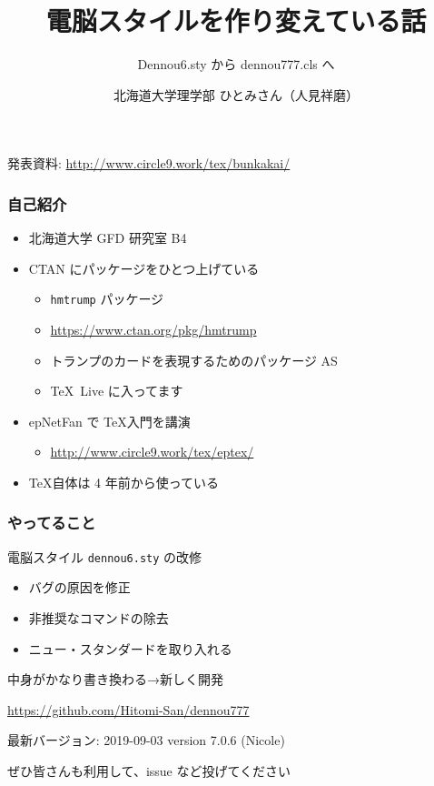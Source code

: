 \documentclass[unicode,12pt,colorlinks,]{beamer}
\title{電脳スタイルを作り変えている話}
\subtitle{Dennou6.sty から dennou777.cls へ}
\author{北海道大学理学部 ひとみさん（人見祥磨）}
\date{\warekitoday}
\newcommand{\centeralign}[1]{\rule{0pt}{0pt}\hfill#1\hfill\rule{0pt}{0pt}}
\begin{document}
\begin{frame}
	\maketitle
	
	\centeralign{{\footnotesize 発表資料: \url{http://www.circle9.work/tex/bunkakai/}}}
\end{frame}

\begin{frame}
	\frametitle{自己紹介}
	\begin{itemize}
		\item 北海道大学 GFD 研究室 B4
		\item CTAN にパッケージをひとつ上げている
			\begin{itemize}
				\item \texttt{hmtrump} パッケージ
				\item \url{https://www.ctan.org/pkg/hmtrump}
				\item トランプのカードを表現するためのパッケージ \trump AS
				\item \TeX\ Live に入ってます
			\end{itemize}
		\item epNetFan で \TeX 入門を講演
			\begin{itemize}
				\item \url{http://www.circle9.work/tex/eptex/}
			\end{itemize}
		\item \TeX 自体は 4 年前から使っている
	\end{itemize}
\end{frame}


\begin{frame}
	\frametitle{やってること}
	電脳スタイル \texttt{dennou6.sty} の改修

	\begin{itemize}
		\item バグの原因を修正
		\item 非推奨なコマンドの除去
		\item ニュー・スタンダードを取り入れる
	\end{itemize}

	中身がかなり書き換わる→新しく開発
\end{frame}

\begin{frame}
	\begin{center}
		{\LARGE{}}

		\url{https://github.com/Hitomi-San/dennou777}

		最新バージョン: 2019-09-03 version 7.0.6 (Nicole)

		\vspace{5ex}
		ぜひ皆さんも利用して、issue など投げてください
	\end{center}
\end{frame}
\end{document}

